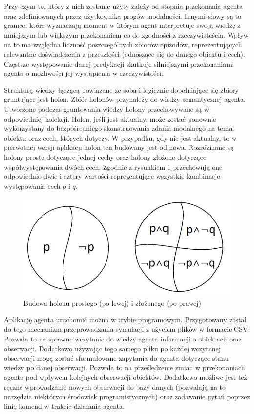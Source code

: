 Przy czym to, który z nich zostanie użyty zależy od stopnia przekonania agenta oraz zdefiniowanych przez użytkownika progów modalności. Innymi słowy są to granice, które wyznaczają moment w którym agent interpretuje swoją wiedzę z mniejszym lub większym przekonaniem co do zgodności z rzeczywistością. Wpływ na to ma względna liczność poszczególnych zbiorów epizodów, reprezentujących relewantne doświadczenia z przeszłości (odnoszące się do danego obiektu i cech). Częstsze występowanie danej predykacji skutkuje silniejszymi przekonaniami agenta o możliwości jej wystąpienia w rzeczywistości.

Strukturą wiedzy łączącą powiązane ze sobą i logicznie dopełniające się zbiory gruntujące jest holon. Zbiór holonów przynależy do wiedzy semantycznej agenta. Utworzone podczas gruntowania wiedzy holony przechowywane są w odpowiedniej kolekcji. Holon, jeśli jest aktualny, może zostać ponownie wykorzystany do bezpośredniego skonstruowania zdania modalnego na temat obiektu oraz cech, których dotyczy. W przypadku, gdy nie jest aktualny, to w pierwotnej wersji aplikacji holon ten budowany jest od nowa. Rozróżniane są holony proste dotyczące jednej cechy oraz holony złożone dotyczące współwystępowania dwóch cech. Zgodnie z rysunkiem \ref{rys:holony} przechowują one odpowiednio dwie i cztery wartości reprezentujące wszystkie kombinacje występowania cech $ p $ i $ q $.

\begin{figure}  
	\centering\includegraphics[width=.6\textwidth]{img/holony}
	\caption{Budowa holonu prostego (po lewej) i złożonego (po prawej)}
	\label{rys:holony}
\end{figure}

Aplikację agenta uruchomić można w trybie programowym. Przygotowany został do tego mechanizm przeprowadzania symulacji z użyciem plików w formacie CSV. Pozwala to na sprawne wczytanie do wiedzy agenta informacji o obiektach oraz obserwacji. Dodatkowo używając tego samego pliku po każdej wczytanej obserwacji mogą zostać sformułowane zapytania do agenta dotyczące stanu wiedzy po danej obserwacji. Pozwala to na prześledzenie zmian w przekonaniach agenta pod wpływem kolejnych obserwacji obiektów. Dodatkowo możliwe jest też ręczne wprowadzanie nowych obserwacji do bazy danych (pozwalają na to narzędzia niektórych środowisk programistycznych) oraz zadawanie pytań poprzez linię komend w trakcie działania agenta. 

